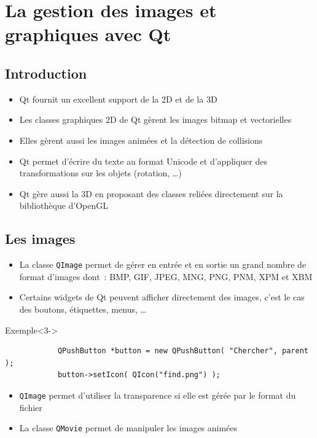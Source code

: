 \documentclass{beamer} %
\begin{document}
\section{La gestion des images et graphiques avec Qt}
\subsection{Introduction}
\begin{frame}
	\begin{itemize}
	\item Qt fournit un excellent support de la 2D et de la 3D
	\item<2-> Les classes graphiques 2D de Qt gèrent les images bitmap et vectorielles
	\item<3-> Elles gèrent aussi les images animées et la détection de collisions
	\item<4-> Qt permet d'écrire du texte au format Unicode et d'appliquer des transformations sur les objets (rotation, \ldots)
	\item<5-> Qt gère aussi la 3D en proposant des classes reliées directement sur la bibliothèque d'OpenGL
	\end{itemize}
\end{frame}

\subsection{Les images}
\begin{frame}[fragile]
	\begin{itemize}
	\item La classe \texttt{QImage} permet de gérer en entrée et en sortie un grand nombre de format d'images dont~: BMP, GIF, JPEG, MNG, PNG, PNM, XPM et XBM
	\item<2-> Certains widgets de Qt peuvent afficher directement des images, c'est le cas des boutons, étiquettes, menus, \ldots
	\end{itemize}

	\begin{exampleblock}{Exemple}<3->
		\begin{lstlisting}
			QPushButton *button = new QPushButton( "Chercher", parent );
			button->setIcon( QIcon("find.png") );
		\end{lstlisting}
	\end{exampleblock}

	
	\begin{itemize}
	\item<5-> \texttt{QImage} permet d'utiliser la transparence si elle est gérée par le format du fichier 
	\item<6-> La classe \texttt{QMovie} permet de manipuler les images animées
	\end{itemize}
\end{frame}
\end{document}
